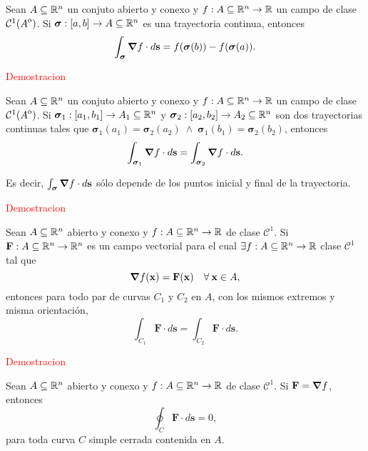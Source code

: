

\begin{theorem} \label{thm:t1}
    Sean $A\subseteq\mathbb{R}^n$ un conjuto abierto y conexo y  $f:A\subseteq\mathbb{R}^n\to\mathbb{R}$ un campo de clase $\mathcal{C}^1({\kern0ptA}^{\mathrm{o}})$. Si $\boldsymbol{\sigma}:[a,b]\to A\subseteq\mathbb{R}^n$ es una trayectoria continua,  entonces
    \[
       \int_{\boldsymbol{\sigma}}\grad f\cdot d\mathbf{s}=f(\boldsymbol{\sigma}(b))-f(\boldsymbol{\sigma}(a)).
    \]    
\end{theorem}

\textcolor{red}{Demostracion}

\begin{corollary}
    Sean $A\subseteq\mathbb{R}^n$ un conjuto abierto y conexo y  $f:A\subseteq\mathbb{R}^n\to\mathbb{R}$ un campo de clase $\mathcal{C}^1({\kern0ptA}^{\mathrm{o}})$.  Si  $\boldsymbol{\sigma}_1:[a_1,b_1]\to A_1\subseteq\mathbb{R}^n$ y $\boldsymbol{\sigma}_2:[a_2,b_2]\to A_2\subseteq\mathbb{R}^n$ son dos trayectorias continuas  tales que $\boldsymbol{\sigma}_1(a_1)=\boldsymbol{\sigma}_2(a_2)\;\land\;\boldsymbol{\sigma}_1(b_1)=\boldsymbol{\sigma}_2(b_2)$, entonces
    \[
    \int_{\boldsymbol{\sigma}_1}\grad f\cdot d\mathbf{s}=\int_{\boldsymbol{\sigma}_2}\grad f\cdot d\mathbf{s}.
    \]
    
 Es decir,  $\int_{\boldsymbol{\sigma}}\grad f\cdot d\mathbf{s}$  s\'olo depende de los puntos inicial y final de la trayectoria.
\end{corollary}

\textcolor{red}{Demostracion}

\begin{corollary}
    Sean $A\subseteq\mathbb{R}^n$ abierto y conexo y $f:A\subseteq\mathbb{R}^n\to\mathbb{R}$ de clase $\mathcal{C}^1$. Si $\mathbf{F}:A\subseteq\mathbb{R}^n\to\mathbb{R}^n$ es un campo vectorial para el cual $\exists f:A\subseteq\mathbb{R}^n\to\mathbb{R}$ clase $\mathcal{C}^1$ tal que 
    $$\grad f(\mathbf{x})=\mathbf{F}(\mathbf{x})\quad\forall\:\mathbf{x}\in A,$$
    entonces para todo par de curvas $C_1$ y $C_2$ en $A$, con los mismos extremos y misma orientaci\'on,
    \[
    \int_{C_1}\mathbf{F}\cdot d\mathbf{s}=\int_{C_2}\mathbf{F}\cdot d\mathbf{s}. 
    \]
\end{corollary}


\textcolor{red}{Demostracion}

\begin{corollary}
    Sean $A\subseteq\mathbb{R}^n$ abierto y conexo y $f:A\subseteq\mathbb{R}^n\to\mathbb{R}$ de clase $\mathcal{C}^1$. Si $\mathbf{F}=\grad f$, entonces
    $$\oint_C\mathbf{F}\cdot d\mathbf{s}=0,$$
    para toda curva $C$ simple cerrada contenida en $A$.
\end{corollary}

